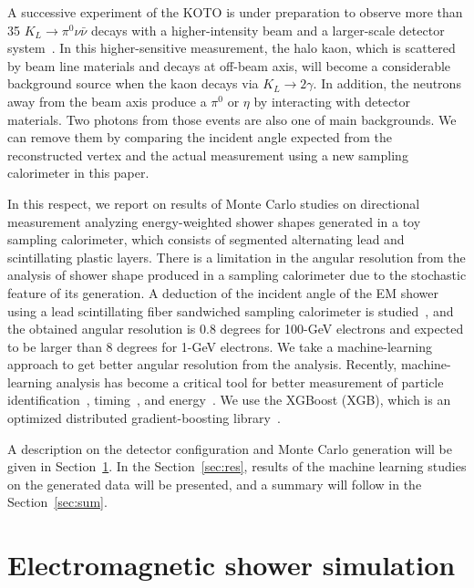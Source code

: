 \documentclass[12pt,times,draftclsnofoot,a4paper]{elsarticle}
\begin{document}
A successive experiment of the KOTO is under preparation to observe more than 35 $K_{L} \rightarrow \pi^{0}\nu\bar{\nu}$ decays with a higher-intensity beam and a larger-scale detector system~\cite{KOTO2}. In this higher-sensitive measurement, the halo kaon, which is scattered by beam line materials and decays at off-beam axis, will become a considerable background source when the kaon decays via $K_{L} \rightarrow 2\gamma$. In addition, the neutrons away from the beam axis produce a $\pi^{0}$ or $\eta$ by interacting with detector materials. Two photons from those events are also one of main backgrounds. We can remove them by comparing the incident angle expected from the reconstructed vertex and the actual measurement using a new sampling calorimeter in this paper.

In this respect, we report on results of Monte Carlo studies on directional measurement analyzing energy-weighted shower shapes generated in a toy sampling calorimeter, which consists of segmented alternating lead and scintillating plastic layers. There is a limitation in the angular resolution from the analysis of shower shape produced in a sampling calorimeter due to the stochastic feature of its generation. A deduction of the incident angle of the EM shower using a lead scintillating fiber sandwiched sampling calorimeter is studied~\cite{PbScint}, and the obtained angular resolution is 0.8 degrees for 100-GeV electrons and expected to be larger than 8 degrees for 1-GeV electrons. We take a machine-learning approach to get better angular resolution from the analysis. Recently, machine-learning analysis has become a critical tool for better measurement of particle identification~\cite{mlp}, timing~\cite{mlt}, and energy~\cite{mle}. We use the XGBoost (XGB), which is an optimized distributed gradient-boosting library~\cite{xgboost:2016}.

A description on the detector configuration and Monte Carlo generation will be given in Section~\ref{sec:ems}. In the Section~\ref{sec:res}, results of the machine learning studies on the generated data will be presented, and a summary will follow in the Section~\ref{sec:sum}. 

\section{Electromagnetic shower simulation}
\label{sec:ems}
\end{document}
